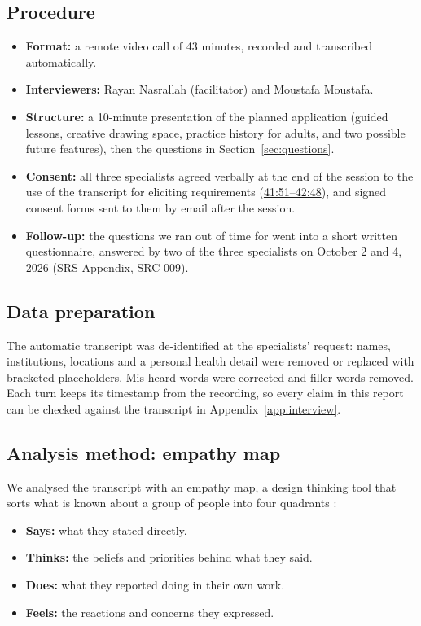 \documentclass{article}
\newcommand{\intlink}[3]{\hyperref[int:#1-#2]{#3}}
\begin{document}
\subsection{Procedure}

\begin{itemize}
\item \textbf{Format:} a remote video call of 43 minutes, recorded and
  transcribed automatically.
\item \textbf{Interviewers:} Rayan Nasrallah (facilitator) and Moustafa
  Moustafa.
\item \textbf{Structure:} a 10-minute presentation of the planned application
  (guided lessons, creative drawing space, practice history for adults, and
  two possible future features), then the questions in
  Section~\ref{sec:questions}.
\item \textbf{Consent:} all three specialists agreed verbally at the end of
  the session to the use of the transcript for eliciting requirements
  (\intlink{Rayan}{41:51}{41:51--42:48}), and signed consent forms sent to them
  by email after the session.
\item \textbf{Follow-up:} the questions we ran out of time for went into a
  short written questionnaire, answered by two of the three specialists on
  October 2 and 4, 2026 (SRS Appendix, SRC-009).
\end{itemize}

\subsection{Data preparation}

The automatic transcript was de-identified at the specialists' request:
names, institutions, locations and a personal health detail were removed or
replaced with bracketed placeholders. Mis-heard words were corrected and
filler words removed. Each turn keeps its timestamp from the recording, so
every claim in this report can be checked against the transcript in
Appendix~\ref{app:interview}.

\subsection{Analysis method: empathy map}

We analysed the transcript with an empathy map, a design thinking tool that
sorts what is known about a group of people into four quadrants
\cite{gray2010gamestorming, gibbons2018empathy}:

\begin{itemize}
\item \textbf{Says:} what they stated directly.
\item \textbf{Thinks:} the beliefs and priorities behind what they said.
\item \textbf{Does:} what they reported doing in their own work.
\item \textbf{Feels:} the reactions and concerns they expressed.
\end{itemize}
\end{document}
